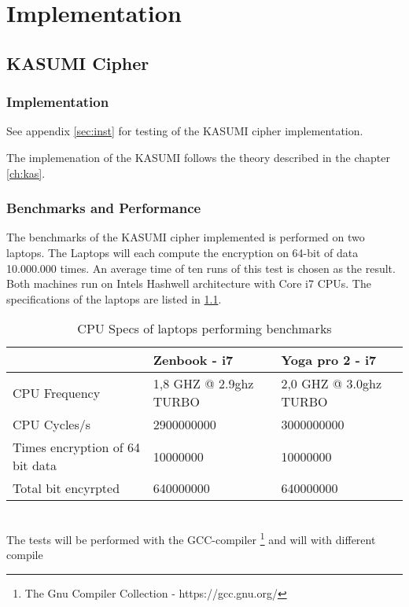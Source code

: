 \chapter{Implementation}
\label{ch:impl}
\section{KASUMI Cipher}
\subsection{Implementation}

See appendix \ref{sec:inst} for testing of the KASUMI cipher implementation.

The implemenation of the KASUMI follows the theory described in the
chapter \ref{ch:kas}.

\subsection{Benchmarks and Performance}
\label{sec:benchkas}
The benchmarks of the KASUMI cipher implemented is performed on two
laptops. The Laptops will each compute the encryption on 64-bit of
data 10.000.000 times. An average time of ten runs of this test is
chosen as the result. Both machines run on Intels Hashwell
architecture with Core i7 CPUs. The specifications of the laptops are
listed in \ref{tab:specs}.
\begin{table}[h!]
    \begin{tabular}{l|l|l}
                                    & Zenbook - i7           & Yoga
                                                               pro 2 -
      i7\\ \hline
    CPU Frequency                   & 1,8 GHZ @ 2.9ghz TURBO & 2,0 GHZ @ 3.0ghz TURBO \\ \hline
    CPU Cycles/s                    & 2900000000             & 3000000000             \\ \hline
    Times encryption of 64 bit data & 10000000               & 10000000               \\ \hline
    Total bit encyrpted             & 640000000              & 640000000              \\
    \end{tabular}
    \caption{CPU Specs of laptops performing benchmarks}
    \label{tab:specs}
\end{table}\\
The tests will be performed with the
GCC-compiler \footnote{The Gnu Compiler Collection -
  https://gcc.gnu.org/} and will  with different compile
